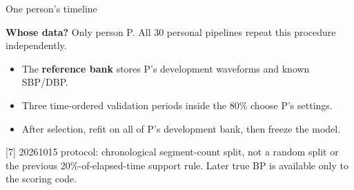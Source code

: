\documentclass[aspectratio=169,11pt]{beamer}
\newcommand{\stagecontext}{Data and terminology}
\newcommand{\stage}[1]{\gdef\stagecontext{#1}}
\newcommand{\source}[1]{\vfill\par{\fontsize{7}{8}\selectfont\color{Muted}#1}}
\newcommand{\whose}[1]{\par{\small\color{Teal}\textbf{Whose data?} #1}\par\medskip}
\begin{document}
\stage{Personalization: one target person's early and later data}
\begin{frame}{One person's timeline}

\whose{Only person P. All 30 personal pipelines repeat this procedure independently.}
\begin{center}\end{center}
\begin{itemize}\setlength\itemsep{3mm}
\item The \textbf{reference bank} stores P's development waveforms and known SBP/DBP.
\item Three time-ordered validation periods inside the 80\% choose P's settings.
\item After selection, refit on all of P's development bank, then freeze the model.
\end{itemize}
\source{[7] 20261015 protocol: chronological segment-count split, not a random split or the previous 20\%-of-elapsed-time support rule. Later true BP is available only to the scoring code.}

\end{frame}
\end{document}
